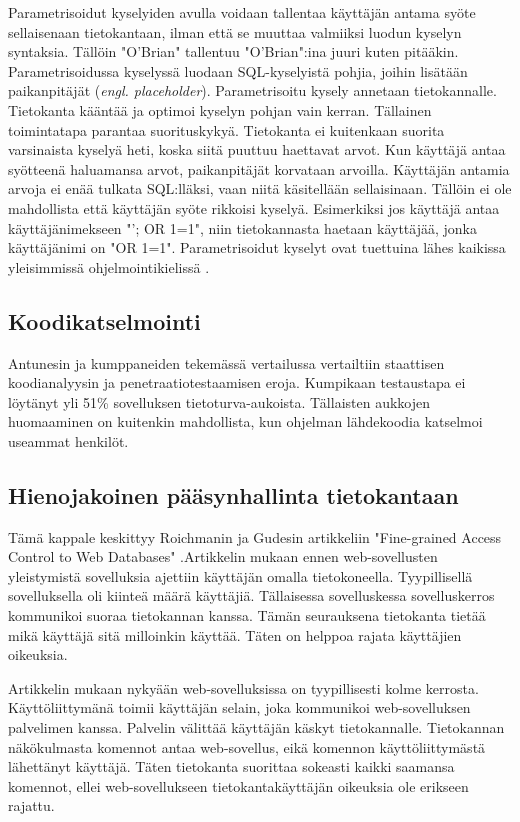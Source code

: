 \documentclass[finnish]{tktltiki2}
\theoremstyle{definition}
\theoremstyle{remark}
\begin{document}
		Parametrisoidut kyselyiden avulla voidaan tallentaa käyttäjän antama syöte sellaisenaan tietokantaan, ilman että se muuttaa valmiiksi luodun kyselyn syntaksia. Tällöin "O'Brian" tallentuu "O'Brian":ina juuri kuten pitääkin. Parametrisoidussa kyselyssä luodaan SQL-kyselyistä pohjia, joihin lisätään paikanpitäjät (\textit{engl. placeholder}). Parametrisoitu kysely annetaan tietokannalle. Tietokanta kääntää ja optimoi kyselyn pohjan vain kerran. Tällainen toimintatapa parantaa suorituskykyä. Tietokanta ei kuitenkaan suorita varsinaista kyselyä heti, koska siitä puuttuu haettavat arvot. Kun käyttäjä antaa syötteenä haluamansa arvot, paikanpitäjät korvataan arvoilla. Käyttäjän antamia arvoja ei enää tulkata SQL:lläksi, vaan niitä käsitellään sellaisinaan. Tällöin ei ole mahdollista että käyttäjän syöte rikkoisi kyselyä. Esimerkiksi jos käyttäjä antaa käyttäjänimekseen "'; OR 1=1", niin tietokannasta haetaan käyttäjää, jonka käyttäjänimi on "OR 1=1".
		Parametrisoidut kyselyt ovat tuettuina lähes kaikissa yleisimmissä ohjelmointikielissä \cite{java}.
		
		\subsection{Koodikatselmointi}
		Antunesin ja kumppaneiden tekemässä vertailussa\cite{vertailu} vertailtiin staattisen koodianalyysin ja penetraatiotestaamisen eroja. Kumpikaan testaustapa ei löytänyt yli 51\% sovelluksen tietoturva-aukoista. Tällaisten aukkojen huomaaminen on kuitenkin mahdollista, kun ohjelman lähdekoodia katselmoi useammat henkilöt.
		
		\subsection{Hienojakoinen pääsynhallinta tietokantaan}
		Tämä kappale keskittyy Roichmanin ja Gudesin artikkeliin "Fine-grained Access Control to Web Databases" \cite{access}.\space Artikkelin mukaan ennen web-sovellusten yleistymistä sovelluksia ajettiin käyttäjän omalla tietokoneella. Tyypillisellä sovelluksella oli kiinteä määrä  käyttäjiä. Tällaisessa sovelluskessa sovelluskerros kommunikoi suoraa tietokannan kanssa. Tämän seurauksena tietokanta tietää mikä käyttäjä sitä milloinkin käyttää. Täten on helppoa rajata käyttäjien oikeuksia.
		
		Artikkelin mukaan nykyään web-sovelluksissa on tyypillisesti kolme kerrosta. Käyttöliittymänä toimii käyttäjän selain, joka kommunikoi web-sovelluksen palvelimen kanssa. Palvelin välittää käyttäjän käskyt tietokannalle. Tietokannan näkökulmasta komennot antaa web-sovellus, eikä komennon käyttöliittymästä lähettänyt käyttäjä. Täten tietokanta suorittaa sokeasti kaikki saamansa komennot, ellei web-sovellukseen tietokantakäyttäjän oikeuksia ole erikseen rajattu.
		
\end{document}
